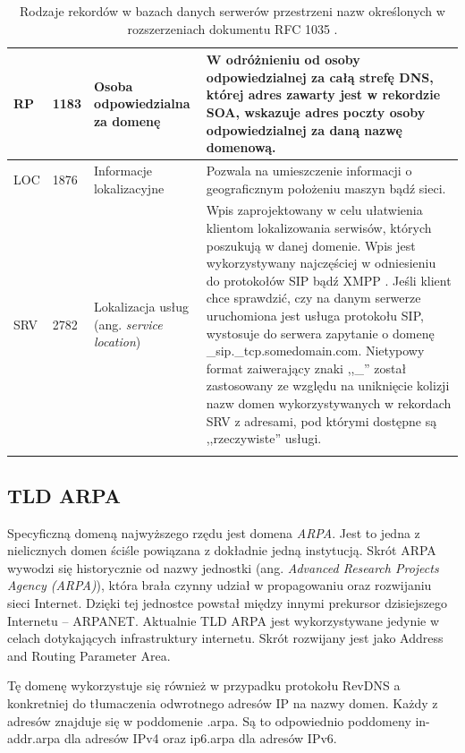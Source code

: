 \begin{longtable}{|l|p{0.7cm}|p{2.5cm}|p{7.5cm}|}
		RP & 1183 \cite{RFC1183} & Osoba odpowiedzialna za domenę & W odróżnieniu od osoby odpowiedzialnej za całą strefę DNS, której adres zawarty jest
		w rekordzie SOA, wskazuje adres poczty osoby odpowiedzialnej za daną nazwę domenową. \\ \hline

		LOC & 1876 \cite{RFC1876} & Informacje lokalizacyjne & Pozwala na umieszczenie informacji o geograficznym położeniu maszyn
		bądź sieci. \\ \hline

		SRV & 2782 \cite{RFC2782} & Lokalizacja usług (ang. \textit{service location}) &
		Wpis zaprojektowany w celu ułatwienia klientom lokalizowania serwisów, których poszukują w danej domenie.
		Wpis jest wykorzystywany najczęściej w odniesieniu do protokołów SIP \cite{RFC3261} bądź XMPP \cite{RFC3921}.
		Jeśli klient chce sprawdzić, czy na danym serwerze uruchomiona jest usługa protokołu SIP, wystosuje do serwera zapytanie o
		domenę \_sip.\_tcp.somedomain.com. Nietypowy format zaiwerający znaki ,,\_'' został zastosowany ze względu na uniknięcie kolizji
		nazw domen wykorzystywanych w rekordach SRV z adresami, pod którymi dostępne są ,,rzeczywiste'' usługi. \\

		\hline
\caption{Rodzaje rekordów w bazach danych serwerów przestrzeni nazw określonych w rozszerzeniach dokumentu RFC 1035 \cite{RFC1035}.}
\label{typyRekordowDnsExt}
\end{longtable}

\subsection{TLD ARPA}
Specyficzną domeną najwyższego rzędu jest domena \textit{ARPA}. Jest to jedna z nielicznych domen ściśle powiązana z dokładnie jedną
instytucją. Skrót ARPA wywodzi się historycznie od nazwy jednostki (ang. \textit{Advanced Research Projects Agency (ARPA)}), która
brała czynny udział w propagowaniu oraz rozwijaniu sieci Internet. Dzięki tej jednostce powstał między innymi prekursor dzisiejszego
Internetu -- ARPANET. Aktualnie TLD ARPA jest wykorzystywane jedynie w celach dotykających infrastruktury internetu. Skrót rozwijany jest
jako Address and Routing Parameter Area.

Tę domenę wykorzystuje się również w przypadku protokołu RevDNS a konkretniej do tłumaczenia
odwrotnego adresów IP na nazwy domen. Każdy z adresów znajduje się w poddomenie .arpa. Są to odpowiednio poddomeny in-addr.arpa dla
adresów IPv4 oraz ip6.arpa dla adresów IPv6.

